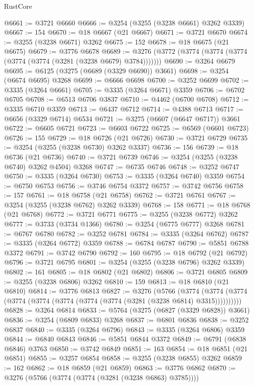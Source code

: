\begin{lexlean}{RustCore}
\begin{coremodule}
@6661 := @3721 @6660
@6666 := @3254 (@3255 (@3238 @6661) @3262 @3339)
@6667 := 154
@6670 := @18 @6667 (@21 @6667)
@6671 := @3721 @6670
@6674 := @3255 (@3238 @6671) @3262
@6675 := 152
@6678 := @18 @6675 (@21 @6675)
@6679 := @3776 @6678
@6689 := @3276 (@3772 (@3774 (@3774 (@3774 (@3774 (@3774 (@3281 (@3238 @6679) @3784)))))))
@6690 := @3264 @6679
@6695 := @6125 (@3275 (@6689 (@3329 @6690)) @3661)
@6698 := @3254 (@6674 @6695) @3268
@6699 := @6666 @6698
@6700 := @3252 @6699
@6702 := @3335 (@3264 @6661)
@6705 := @3335 (@3264 @6671) @3359
@6706 := @6702 @6705
@6708 := @6513 @6706 @3837
@6710 := @4462 (@6700 @6708)
@6712 := @3335 @6710 @3359
@6713 := @6437 @6712
@6714 := @4388 @6713
@6717 := @6656 (@3329 @6714) @6534
@6721 := @3275 (@6607 (@6647 @6717)) @3661
@6722 := @6605 @6721
@6723 := @6603 @6722
@6725 := @6569 (@6601 @6723)
@6726 := 155
@6729 := @18 @6726 (@21 @6726)
@6730 := @3721 @6729
@6735 := @3254 (@3255 (@3238 @6730) @3262 @3337)
@6736 := 156
@6739 := @18 @6736 (@21 @6736)
@6740 := @3721 @6739
@6746 := @3254 (@3255 (@3238 @6740) @3262 @4504) @3268
@6747 := @6735 @6746
@6748 := @3252 @6747
@6750 := @3335 (@3264 @6730)
@6753 := @3335 (@3264 @6740) @3359
@6754 := @6750 @6753
@6756 := @3746 @6754 @3372
@6757 := @3742 @6756
@6758 := 157
@6761 := @18 @6758 (@21 @6758)
@6762 := @3721 @6761
@6767 := @3254 (@3255 (@3238 @6762) @3262 @3339)
@6768 := 158
@6771 := @18 @6768 (@21 @6768)
@6772 := @3721 @6771
@6775 := @3255 (@3238 @6772) @3262
@6777 := @3733 (@3734 @1366)
@6780 := @3254 (@6775 @6777) @3268
@6781 := @6767 @6780
@6782 := @3252 @6781
@6784 := @3335 (@3264 @6762)
@6787 := @3335 (@3264 @6772) @3359
@6788 := @6784 @6787
@6790 := @5851 @6788 @3372
@6791 := @3742 @6790
@6792 := 160
@6795 := @18 @6792 (@21 @6792)
@6796 := @3721 @6795
@6801 := @3254 (@3255 (@3238 @6796) @3262 @3339)
@6802 := 161
@6805 := @18 @6802 (@21 @6802)
@6806 := @3721 @6805
@6809 := @3255 (@3238 @6806) @3262
@6810 := 159
@6813 := @18 @6810 (@21 @6810)
@6814 := @3776 @6813
@6827 := @3276
    (@5766
      (@3774 (@3774 (@3774 (@3774 (@3774 (@3774 (@3774 (@3774 (@3281 (@3238 @6814) @3315))))))))))
@6828 := @3264 @6814
@6833 := @5764 (@3275 (@6827 (@3329 @6828)) @3661)
@6836 := @3254 (@6809 @6833) @3268
@6837 := @6801 @6836
@6838 := @3252 @6837
@6840 := @3335 (@3264 @6796)
@6843 := @3335 (@3264 @6806) @3359
@6844 := @6840 @6843
@6846 := @5851 @6844 @3372
@6849 := @6791 (@6838 @6846) @3763
@6850 := @3742 @6849
@6851 := 163
@6854 := @18 @6851 (@21 @6851)
@6855 := @3257 @6854
@6858 := @3255 (@3238 @6855) @3262
@6859 := 162
@6862 := @18 @6859 (@21 @6859)
@6863 := @3776 @6862
@6870 := @3276 (@5766 (@3774 (@3774 (@3281 (@3238 @6863) @3785))))

\end{coremodule}
\end{lexlean}
